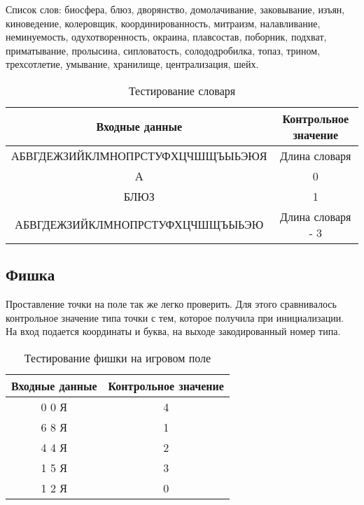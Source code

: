 \documentclass[a4paper,14pt]{article}
\begin{document}
	Список слов: биосфера, блюз, дворянство, домолачивание, заковывание, изъян, киноведение, колеровщик, координированность, митраизм, налавливание, неминуемость, одухотворенность, окраина, плавсостав, поборник, подхват, приматывание, пролысина, сипловатость, солододробилка, топаз, трином, трехсотлетие, умывание, хранилище, централизация, шейх.
	\begin{table}[!h]
		\begin{center}
		\caption{Тестирование словаря}
		\begin{tabular}{|c|c|}
			\hline
			         Входные данные          & Контрольное значение \\ \hline
			АБВГДЕЖЗИЙКЛМНОПРСТУФХЦЧШЩЪЫЬЭЮЯ &    Длина словаря     \\ \hline
			               А                 &          0           \\ \hline
			              БЛЮЗ               &          1           \\ \hline
			АБВГДЕЖЗИЙКЛМНОПРСТУФХЦЧШЩЪЫЬЭЮ  &  Длина словаря - 3   \\ \hline
		\end{tabular}
		\end{center}
	\end{table}

	\subsection{Фишка}
	Проставление точки на поле так же легко проверить. Для этого сравнивалось контрольное значение типа точки с тем, которое получила при инициализации. На вход подается координаты и буква, на выходе закодированный номер типа.
	
	\begin{table}[!h]
		\begin{center}
			\caption{Тестирование фишки на игровом поле}
			\begin{tabular}{|c|c|}
				\hline
				Входные данные          & Контрольное значение \\ \hline
				0 0 Я& 4 \\ \hline
				6 8 Я& 1 \\ \hline
				4 4 Я& 2 \\ \hline
				1 5 Я& 3 \\ \hline
				1 2 Я& 0 \\ \hline
			\end{tabular}
		\end{center}
	\end{table}
\end{document}
